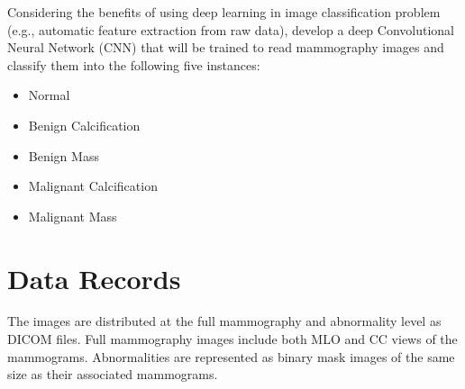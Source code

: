 \documentclass{book}
\begin{document}
        Considering the benefits of using deep learning in image classification problem (e.g., automatic feature extraction from raw data), develop a deep Convolutional Neural Network (CNN) that will be trained to read mammography images and classify them into the following five instances:

        \begin{itemize}
            \item Normal
            \item Benign Calcification
            \item Benign Mass
            \item Malignant Calcification
            \item Malignant Mass
        \end{itemize}
         
        \section{Data Records}
        The images are distributed at the full mammography and abnormality level as DICOM files. Full mammography images include both MLO and CC views of the mammograms. Abnormalities are represented as binary mask images of the same size as their associated
        mammograms. 
\end{document}
